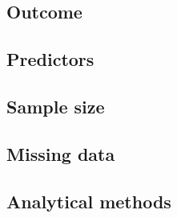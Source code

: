 \documentclass{article}
\begin{document}
\subsection{Outcome}\label{sec:outcome}



\subsection{Predictors}\label{sec:predictors}



\subsection{Sample size}\label{sec:sample_size}

\subsection{Missing data}\label{sec:missing_data}

\subsection{Analytical methods}\label{sec:analytical_methods}
\end{document}
